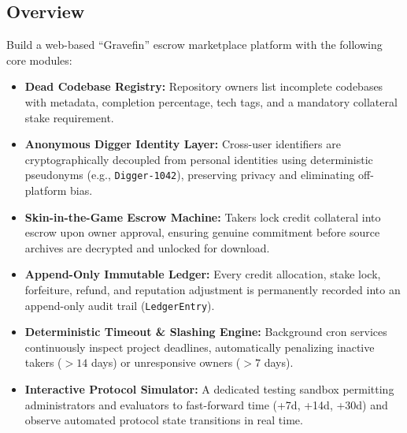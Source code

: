 \documentclass[11pt,a4paper]{article}
\begin{document}
\subsection{Overview}
Build a web-based ``Gravefin'' escrow marketplace platform with the following core modules:
\begin{itemize}
    \item \textbf{Dead Codebase Registry:} Repository owners list incomplete codebases with metadata, completion percentage, tech tags, and a mandatory collateral stake requirement.
    \item \textbf{Anonymous Digger Identity Layer:} Cross-user identifiers are cryptographically decoupled from personal identities using deterministic pseudonyms (e.g., \texttt{Digger-1042}), preserving privacy and eliminating off-platform bias.
    \item \textbf{Skin-in-the-Game Escrow Machine:} Takers lock credit collateral into escrow upon owner approval, ensuring genuine commitment before source archives are decrypted and unlocked for download.
    \item \textbf{Append-Only Immutable Ledger:} Every credit allocation, stake lock, forfeiture, refund, and reputation adjustment is permanently recorded into an append-only audit trail (\texttt{LedgerEntry}).
    \item \textbf{Deterministic Timeout \& Slashing Engine:} Background cron services continuously inspect project deadlines, automatically penalizing inactive takers ($>14$ days) or unresponsive owners ($>7$ days).
    \item \textbf{Interactive Protocol Simulator:} A dedicated testing sandbox permitting administrators and evaluators to fast-forward time (+7d, +14d, +30d) and observe automated protocol state transitions in real time.
\end{itemize}
\end{document}
